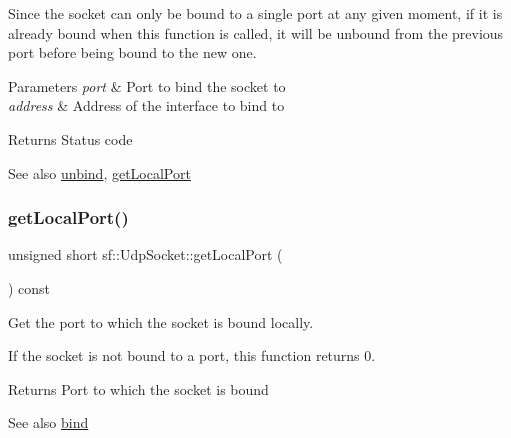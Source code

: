 Since the socket can only be bound to a single port at any given moment, if it is already bound when this function is called, it will be unbound from the previous port before being bound to the new one.


\begin{DoxyParams}{Parameters}
{\em port} & Port to bind the socket to \\
\hline
{\em address} & Address of the interface to bind to\\
\hline
\end{DoxyParams}
\begin{DoxyReturn}{Returns}
Status code
\end{DoxyReturn}
\begin{DoxySeeAlso}{See also}
\mbox{\hyperlink{classsf_1_1_udp_socket_a2c4abb8102a1bd31f51fcfe7f15427a3}{unbind}}, \mbox{\hyperlink{classsf_1_1_udp_socket_a5c03644b3da34bb763bce93e758c938e}{get\+Local\+Port}} \begin{DoxyVerb}\end{DoxyVerb}
 
\end{DoxySeeAlso}
\mbox{\label{classsf_1_1_udp_socket_a5c03644b3da34bb763bce93e758c938e}} 
\subsubsection{\texorpdfstring{getLocalPort()}{getLocalPort()}}
{\footnotesize\ttfamily unsigned short sf\+::\+Udp\+Socket\+::get\+Local\+Port (\begin{DoxyParamCaption}{ }\end{DoxyParamCaption}) const}



Get the port to which the socket is bound locally. 

If the socket is not bound to a port, this function returns 0.

\begin{DoxyReturn}{Returns}
Port to which the socket is bound
\end{DoxyReturn}
\begin{DoxySeeAlso}{See also}
\mbox{\hyperlink{classsf_1_1_udp_socket_ad764c3d06d90b4714dcc97a0d1647bcc}{bind}} \begin{DoxyVerb}\end{DoxyVerb}
 
\end{DoxySeeAlso}
\mbox{\label{classsf_1_1_udp_socket_ade9ca0f7ed7919136917b0b997a9833a}} 
